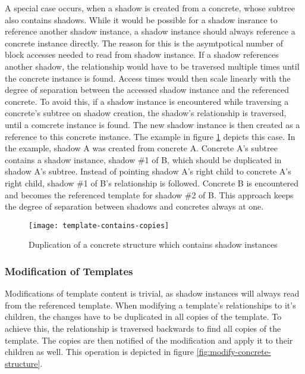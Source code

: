         A special case occurs, when a shadow is created from
        a concrete, whose subtree also contains shadows.
        While it would be possible for a shadow insrance to reference another
        shadow instance, a shadow instance should always reference a concrete
        instance directly. The reason for this is the asymtpotical number
        of block accesses needed to read from shadow instance. If a shadow references
        another shadow, the  relationship would
        have to be traversed multiple times until the concrete instance
        is found. Access times would then scale linearly with
        the degree of separation between the accessed shadow instance
        and the referenced concrete. To avoid this, if a shadow
        instance is encountered while traversing a concrete's
        subtree on shadow creation, the shadow's 
        relationship is traversed, until a comcrete instance is found.
        The new shadow instance is then created as a reference to this
        concrete instance. The example in figure \ref{fig:template-contains-copies}
        depicts this case. In the example, shadow A was created from
        concrete A. Concrete A's subtree contains a shadow instance,
        shadow \#1 of B, which should be duplicated in shadow A's subtree.
        Instead of pointing shadow A's right child to concrete A's right child,
        shadow \#1 of B's  relationship is followed.
        Concrete B is encountered
        and becomes the referenced template for shadow \#2 of B.
        This approach keeps the degree of separation between shadows
        and concretes always at one.

        \begin{figure}[H]
            \centering
            \texttt{[image: template-contains-copies]}
            \caption{Duplication of a concrete structure which contains shadow instances}
            \label{fig:template-contains-copies}
        \end{figure}

    \subsubsection{Modification of Templates}
        Modifications of template content is trivial, as shadow instances
        will always read from the referenced template.
        When modifying a template's relationships to it's children,
        the changes have to be duplicated in all copies of the template.
        To achieve this, the  relationship is
        traversed backwards to find all copies of the template. The
        copies are then notified of the modification and apply
        it to their children as well. This operation is
        depicted in figure \ref{fig:modify-concrete-structure}.

